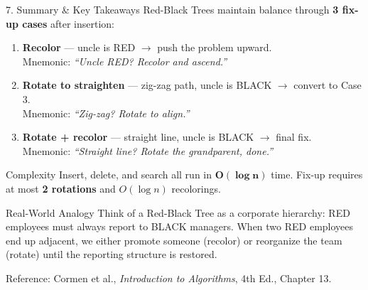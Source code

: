 \documentclass{beamer}
\begin{document}
\begin{frame}{7. Summary \& Key Takeaways}
Red-Black Trees maintain balance through \textbf{3 fix-up cases} after insertion:

\begin{enumerate}
    \item \textbf{Recolor} --- uncle is RED $\rightarrow$ push the problem upward.\\
          {\small Mnemonic: \textit{``Uncle RED? Recolor and ascend.''}}
    \item \textbf{Rotate to straighten} --- zig-zag path, uncle is BLACK $\rightarrow$ convert to Case 3.\\
          {\small Mnemonic: \textit{``Zig-zag? Rotate to align.''}}
    \item \textbf{Rotate + recolor} --- straight line, uncle is BLACK $\rightarrow$ final fix.\\
          {\small Mnemonic: \textit{``Straight line? Rotate the grandparent, done.''}}
\end{enumerate}

\vspace{0.5em}
\begin{block}{Complexity}
Insert, delete, and search all run in $\mathbf{O(\log n)}$ time. Fix-up requires at most \textbf{2 rotations} and $O(\log n)$ recolorings.
\end{block}

\vspace{0.3em}
\begin{block}{Real-World Analogy}
Think of a Red-Black Tree as a corporate hierarchy: RED employees must always report to BLACK managers. When two RED employees end up adjacent, we either promote someone (recolor) or reorganize the team (rotate) until the reporting structure is restored.
\end{block}

\footnotesize{Reference: Cormen et al., \textit{Introduction to Algorithms}, 4th Ed., Chapter 13.}
\end{frame}
\end{document}
